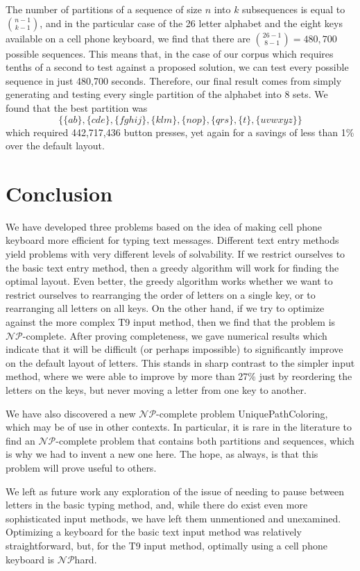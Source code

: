 \documentclass[runningheads]{llncs}
\newcommand{\NP}{\ensuremath{\mathcal{NP}}}
\begin{document}
The number of partitions of a sequence of size $n$ into $k$ subsequences is equal to $\binom{n-1}{k-1}$, and in the particular case of the 26 letter alphabet and the eight keys available on a cell phone keyboard, we find that there are $\binom{26-1}{8-1} = 480,700$ possible sequences.  This means that, in the case of our corpus which requires tenths of a second to test against a proposed solution, we can test every possible sequence in just 480,700 seconds.  Therefore, our final result comes from simply generating and testing every single partition of the alphabet into 8 sets.  We found that the best partition was 
$$\{\{ab\}, \{cde\}, \{fghij\}, \{klm\}, \{nop\}, \{qrs\}, \{t\}, \{uvwxyz\}\}$$
which required 442,717,436 button presses, yet again for a savings of less than 1\% over the default layout.

\section{Conclusion}

We have developed three problems based on the idea of making cell phone keyboard more efficient for typing text messages.  Different text entry methods yield problems with very different levels of solvability.  If we restrict ourselves to the basic text entry method, then a greedy algorithm will work for finding the optimal layout.  Even better, the greedy algorithm works whether we want to restrict ourselves to rearranging the order of letters on a single key, or to rearranging all letters on all keys.  On the other hand, if we try to optimize against the more complex T9 input method, then we find that the problem is \NP-complete.  After proving completeness, we gave numerical results which indicate that it will be difficult (or perhaps impossible) to significantly improve on the default layout of letters.  This stands in sharp contrast to the simpler input method, where we were able to improve by more than 27\% just by reordering the letters on the keys, but never moving a letter from one key to another.

We have also discovered a new \NP-complete problem {\sc UniquePathColoring}, which may be of use in other contexts.  In particular, it is rare in the literature to find an \NP-complete problem that contains both partitions and sequences, which is why we had to invent a new one here.  The hope, as always, is that this problem will prove useful to others.

We left as future work any exploration of the issue of needing to pause between
letters in the basic typing method, and, while there do exist even more
sophisticated input methods\cite{hcimethods}, we have left them unmentioned and unexamined.  Optimizing a keyboard for the basic text input method was relatively straightforward, but, for the T9 input method, optimally using a cell phone keyboard is \NP hard.



\end{document}
